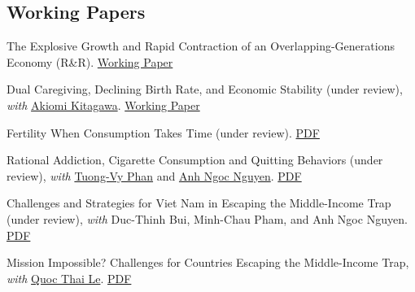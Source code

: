 \documentclass[12pt]{article}
\begin{document}
\subsection{Working Papers}
\begin{enumerate}[label={[\arabic*]}]
\item The Explosive Growth and Rapid Contraction of an Overlapping-Generations Economy (R\&R). \href{https://ideas.repec.org/p/toh/tupdaa/81.html}{Working Paper}
\item Dual Caregiving, Declining Birth Rate, and Economic Stability (under review), \textit{with} \href{https://researchmap.jp/read0118970?lang=en}{Akiomi Kitagawa}. \href{https://ideas.repec.org/p/toh/tupdaa/77.html}{Working Paper}
\item Fertility When Consumption Takes Time (under review). \href{https://app.box.com/s/jpworfeud1uanlgcjjpja2jey9h9m0ds}{PDF}
\item Rational Addiction, Cigarette Consumption and Quitting Behaviors (under review), \textit{with} \href{https://vytuongphan.github.io/}{Tuong-Vy Phan} and \href{https://sites.google.com/depocen.org/anhnguyen}{Anh Ngoc Nguyen}. \href{https://depocenwp.org/modules/publications/watch.php?id=208}{PDF}
\item Challenges and Strategies for Viet Nam in Escaping the Middle-Income Trap (under review), \textit{with} Duc-Thinh Bui, Minh-Chau Pham, and Anh Ngoc Nguyen. \href{https://depocenwp.org/modules/publications/watch.php?id=206}{PDF}
\item Mission Impossible? Challenges for Countries Escaping the Middle-Income Trap, \textit{with} \href{https://sites.google.com/view/quocthaile/homepage/research?authuser=0}{Quoc Thai Le}. \href{https://www2.econ.tohoku.ac.jp/~PDesign/6011.html}{PDF}
\end{enumerate}
\end{document}
